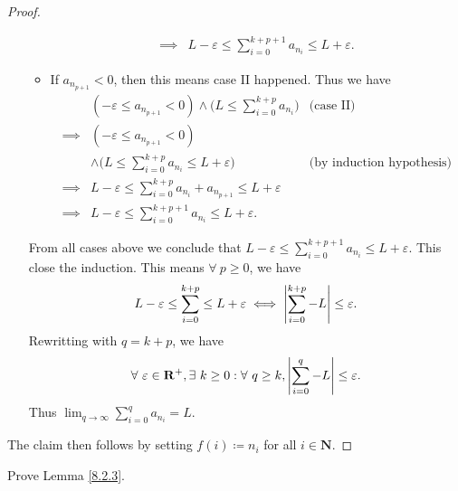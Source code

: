 \begin{proof}
\begin{itemize}
\begin{itemize}
\begin{align*}
                            \implies & L - \varepsilon \leq \sum_{i = 0}^{k + p + 1} a_{n_i} \leq L + \varepsilon.
                        \end{align*}
                  \item If \(a_{n_{p + 1}} < 0\), then this means case II happened.
                        Thus we have
                        \begin{align*}
                                     & (-\varepsilon \leq a_{n_{p + 1}} < 0) \land \Bigg(L \leq \sum_{i = 0}^{k + p} a_{n_i}\Bigg) & \text{(case II)}                 \\
                            \implies & (-\varepsilon \leq a_{n_{p + 1}} < 0)                                                                                          \\
                                     & \land \Bigg(L \leq \sum_{i = 0}^{k + p} a_{n_i} \leq L + \varepsilon\Bigg)                  & \text{(by induction hypothesis)} \\
                            \implies & L - \varepsilon \leq \sum_{i = 0}^{k + p} a_{n_i} + a_{n_{p + 1}} \leq L + \varepsilon                                         \\
                            \implies & L - \varepsilon \leq \sum_{i = 0}^{k + p + 1} a_{n_i} \leq L + \varepsilon.
                        \end{align*}
              \end{itemize}
              From all cases above we conclude that \(L - \varepsilon \leq \sum_{i = 0}^{k + p + 1} a_{n_i} \leq L + \varepsilon\).
              This close the induction.
              This means \(\forall\ p \geq 0\), we have
              \[
                  L - \varepsilon \leq \sum_{i = 0}^{k + p} \leq L + \varepsilon \iff \abs*{\sum_{i = 0}^{k + p} - L} \leq \varepsilon.
              \]
              Rewritting with \(q = k + p\), we have
              \[
                  \forall\ \varepsilon \in \mathbf{R}^+, \exists\ k \geq 0 : \forall\ q \geq k, \abs*{\sum_{i = 0}^q - L} \leq \varepsilon.
              \]
              Thus \(\lim_{q \to \infty} \sum_{i = 0}^q a_{n_i} = L\).
    \end{itemize}
    The claim then follows by setting \(f(i) \coloneqq n_i\) for all \(i \in \mathbf{N}\).
\end{proof}

\exercisesection

\begin{exercise}\label{ex 8.2.1}
    Prove Lemma \ref{8.2.3}.
\end{exercise}

